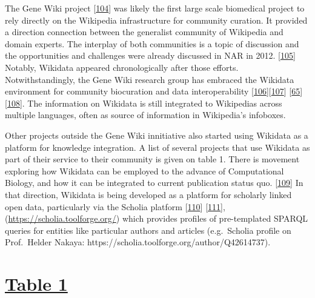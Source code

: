 The Gene Wiki project {[}\protect\hyperlink{ref-18UXATsxP}{104}{]} was likely the first large scale biomedical project to rely directly on the Wikipedia infrastructure for community curation.
It provided a direction connection between the generalist community of Wikipedia and domain experts.
The interplay of both communities is a topic of discussion and the opportunities and challenges were already discussed in NAR in 2012. {[}\protect\hyperlink{ref-13LWXQF0E}{105}{]}\\
Notably, Wikidata appeared chronologically after those efforts.\\
Notwithstandingly, the Gene Wiki research group has embraced the Wikidata environment for community biocuration and data interoperability {[}\protect\hyperlink{ref-2ZhxC0dg}{106}{]}{[}\protect\hyperlink{ref-DaJdrXLk}{107}{]} {[}\protect\hyperlink{ref-3GqlN9Dk}{65}{]} {[}\protect\hyperlink{ref-aQfGxPRH}{108}{]}.
The information on Wikidata is still integrated to Wikipedias across multiple languages, often as source of information in Wikipedia's infoboxes.

Other projects outside the Gene Wiki innitiative also started using Wikidata as a platform for knowledge integration.
A list of several projects that use Wikidata as part of their service to their community is given on table 1.
There is movement exploring how Wikidata can be employed to the advance of Computational Biology, and how it can be integrated to current publication status quo. {[}\protect\hyperlink{ref-1GijvCQtv}{109}{]}
In that direction, Wikidata is being developed as a platform for scholarly linked open data, particularly via the Scholia platform {[}\protect\hyperlink{ref-hxzL9pmm}{110}{]} {[}\protect\hyperlink{ref-PdG2G4Bp}{111}{]},(\url{https://scholia.toolforge.org/}) which provides profiles of pre-templated SPARQL queries for entities like particular authors and articles (e.g.~Scholia profile on Prof.~Helder Nakaya: https://scholia.toolforge.org/author/Q42614737).

\hypertarget{table-1}{%
\section{\texorpdfstring{\href{https://docs.google.com/spreadsheets/d/1loPE0bfJsih4eLrwNGvQf2c-9_I8z-GEvV21496o8h8/edit\#gid=0}{Table 1}}{Table 1}}\label{table-1}}

